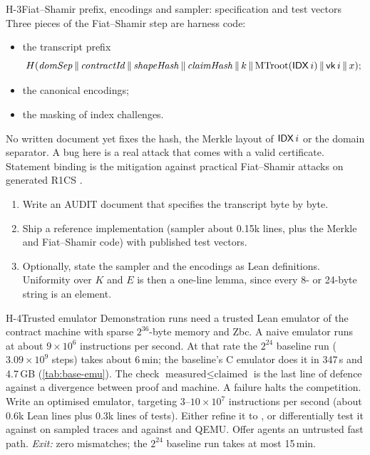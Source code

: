 \begin{issue}{H-3}{Fiat--Shamir prefix, encodings and sampler: specification and test vectors}
\IRprob Three pieces of the Fiat--Shamir step are harness code:
\begin{itemize}[nosep]
\item the transcript prefix
  \[H(\mathit{domSep}\,\|\,\mathit{contractId}\,\|\,\mathit{shapeHash}\,\|\,\mathit{claimHash}\,\|\,k\,\|\,\mathrm{MTroot}(\mathsf{IDX}\,i)\,\|\,\mathsf{vk}\,i\,\|\,x);\]
\item the canonical encodings;
\item the masking of index challenges.
\end{itemize}
No written document yet fixes the hash, the Merkle layout of $\mathsf{IDX}\,i$ or the domain separator.
\IRwhy A bug here is a real attack that comes with a valid certificate. Statement binding is the
mitigation against practical Fiat--Shamir attacks on generated R1CS \cite{KRS25,Fen26-GenR1CS}.
\IRres
\begin{enumerate}[nosep,leftmargin=1.4em]
\item Write an AUDIT document that specifies the transcript byte by byte.
\item Ship a reference implementation (sampler about 0.15k lines, plus the Merkle and Fiat--Shamir
  code) with published test vectors.
\item Optionally, state the sampler and the encodings as Lean definitions. Uniformity over $K$ and
  $E$ is then a one-line lemma, since every 8- or 24-byte string is an element.
\end{enumerate}
\end{issue}

\begin{issue}{H-4}{Trusted emulator}
\IRprob Demonstration runs need a trusted Lean emulator of the contract machine with sparse
$2^{36}$-byte memory and Zbc. A naive emulator runs at about $9\times10^6$ instructions per
second. At that rate the $2^{24}$ baseline run ($3.09\times10^9$ steps) takes about 6\,min; the
baseline's C emulator  does it in 347\,s and 4.7\,GB (\cref{tab:base-emu}).
\IRwhy The check $\text{measured}\le\text{claimed}$ is the last line of defence against a
divergence between proof and machine. A failure halts the competition.
\IRres Write an optimised  emulator, targeting $3$--$10\times10^7$ instructions per
second (about 0.6k Lean lines plus 0.3k lines of tests). Either refine it to , or
differentially test it against  on sampled traces and against  and
QEMU. Offer agents an untrusted fast path.
\emph{Exit:} zero mismatches; the $2^{24}$ baseline run takes at most 15\,min.
\end{issue}

